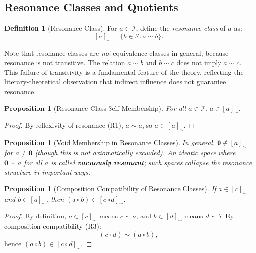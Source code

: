 \documentclass[11pt,openany]{book}
\theoremstyle{definition}
\newtheorem{definition}[axiom]{Definition}
\theoremstyle{plain}
\newtheorem{proposition}[axiom]{Proposition}
\theoremstyle{remark}
\newcommand{\IS}{\mathcal{I}}               %
\newcommand{\compose}{\circ}                 %
\newcommand{\void}{\mathbf{0}}              %
\newcommand{\res}{\sim}                      %
\begin{document}
\subsection{Resonance Classes and Quotients}

\begin{definition}[Resonance Class]
For $a \in \IS$, define the \emph{resonance class} of $a$ as:
\[
[a]_{\res} = \{ b \in \IS : a \res b \}.
\]
\end{definition}

Note that resonance classes are \emph{not} equivalence classes in general, because resonance is not transitive. The relation $a \res b$ and $b \res c$ does not imply $a \res c$. This failure of transitivity is a fundamental feature of the theory, reflecting the literary-theoretical observation that indirect influence does not guarantee resonance.

\begin{proposition}[Resonance Class Self-Membership]
For all $a \in \IS$, $a \in [a]_{\res}$.
\end{proposition}

\begin{proof}
By reflexivity of resonance (R1), $a \res a$, so $a \in [a]_{\res}$.
\end{proof}

\begin{proposition}[Void Membership in Resonance Classes]
In general, $\void \notin [a]_{\res}$ for $a \neq \void$ (though this is not axiomatically excluded). An ideatic space where $\void \res a$ for all $a$ is called \textbf{vacuously resonant}; such spaces collapse the resonance structure in important ways.
\end{proposition}

\begin{proposition}[Composition Compatibility of Resonance Classes]
If $a \in [c]_{\res}$ and $b \in [d]_{\res}$, then $(a \compose b) \in [c \compose d]_{\res}$.
\end{proposition}

\begin{proof}
By definition, $a \in [c]_{\res}$ means $c \res a$, and $b \in [d]_{\res}$ means $d \res b$. By composition compatibility (R3):
\[
(c \compose d) \res (a \compose b),
\]
hence $(a \compose b) \in [c \compose d]_{\res}$.
\end{proof}
\end{document}
